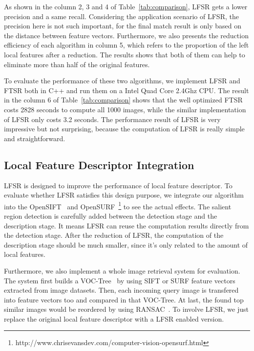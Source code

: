 As shown in the column 2, 3 and 4 of Table~\ref{tab:comparison}, LFSR gets a lower precision and a same recall. Considering the application scenario of LFSR, the precision here is not such important, for the final match result is only based on the distance between feature vectors. Furthermore, we also presents the reduction efficiency of each algorithm in column 5, which refers to the proportion of the left local features after a reduction. The results shows that both of them can help to eliminate more than half of the original features.

To evaluate the performance of these two algorithms, we implement LFSR and FTSR both in C++ and run them on a Intel Quad Core 2.4Ghz CPU. The result in the column 6 of Table~\ref{tab:comparison} shows that the well optimized FTSR costs 2828 seconds to compute all 1000 images, while the similar implementation of LFSR only costs 3.2 seconds. The performance result of LFSR is very impressive but not surprising, because the computation of LFSR is really simple and straightforward.

\subsection{Local Feature Descriptor Integration}
\label{sec:evaluation_integration}

LFSR is designed to improve the performance of local feature descriptor. To evaluate whether LFSR satisfies this design purpose, we integrate our algorithm into the OpenSIFT~ and OpenSURF~\footnote{http://www.chrisevansdev.com/computer-vision-opensurf.html} to see the actual effects. The salient region detection is carefully added between the detection stage and the description stage. It means LFSR can reuse the computation results directly from the detection stage. After the reduction of LFSR, the computation of the description stage should be much smaller, since it's only related to the amount of local features.

Furthermore, we also implement a whole image retrieval system for evaluation. The system first builds a VOC-Tree~\cite{VOCTree2006} by using SIFT or SURF feature vectors extracted from image datasets. Then, each incoming query image is transfered into feature vectors too and compared in that VOC-Tree. At last, the found top similar images would be reordered by using RANSAC~\cite{ransac1981}. To involve LFSR, we just replace the original local feature descriptor with a LFSR enabled version.

